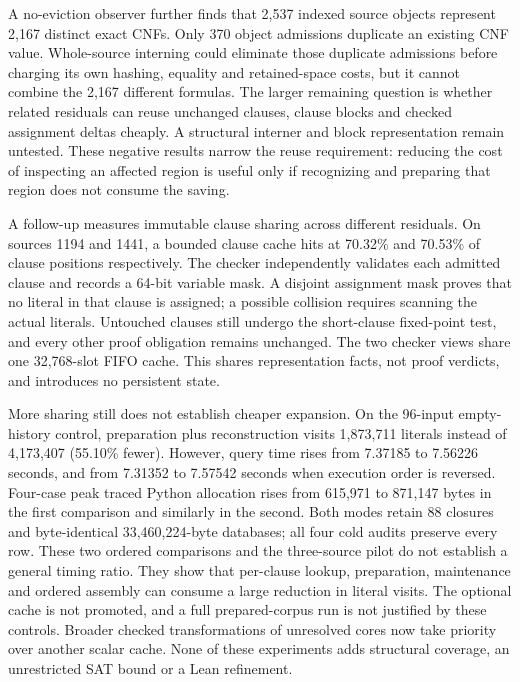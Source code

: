 \documentclass[11pt,a4paper]{article}
\numberwithin{equation}{section}
\theoremstyle{plain}
\theoremstyle{definition}
\theoremstyle{remark}
\begin{document}
A no-eviction observer further finds that 2,537 indexed source objects represent 2,167 distinct exact CNFs. Only 370 object admissions duplicate an existing CNF value. Whole-source interning could eliminate those duplicate admissions before charging its own hashing, equality and retained-space costs, but it cannot combine the 2,167 different formulas. The larger remaining question is whether related residuals can reuse unchanged clauses, clause blocks and checked assignment deltas cheaply. A structural interner and block representation remain untested. These negative results narrow the reuse requirement: reducing the cost of inspecting an affected region is useful only if recognizing and preparing that region does not consume the saving.

A follow-up measures immutable clause sharing across different residuals. On sources 1194 and 1441, a bounded clause cache hits at 70.32\% and 70.53\% of clause positions respectively. The checker independently validates each admitted clause and records a 64-bit variable mask. A disjoint assignment mask proves that no literal in that clause is assigned; a possible collision requires scanning the actual literals. Untouched clauses still undergo the short-clause fixed-point test, and every other proof obligation remains unchanged. The two checker views share one 32,768-slot FIFO cache. This shares representation facts, not proof verdicts, and introduces no persistent state.

More sharing still does not establish cheaper expansion. On the 96-input empty-history control, preparation plus reconstruction visits 1,873,711 literals instead of 4,173,407 (55.10\% fewer). However, query time rises from 7.37185 to 7.56226 seconds, and from 7.31352 to 7.57542 seconds when execution order is reversed. Four-case peak traced Python allocation rises from 615,971 to 871,147 bytes in the first comparison and similarly in the second. Both modes retain 88 closures and byte-identical 33,460,224-byte databases; all four cold audits preserve every row. These two ordered comparisons and the three-source pilot do not establish a general timing ratio. They show that per-clause lookup, preparation, maintenance and ordered assembly can consume a large reduction in literal visits. The optional cache is not promoted, and a full prepared-corpus run is not justified by these controls. Broader checked transformations of unresolved cores now take priority over another scalar cache. None of these experiments adds structural coverage, an unrestricted SAT bound or a Lean refinement.
\end{document}
